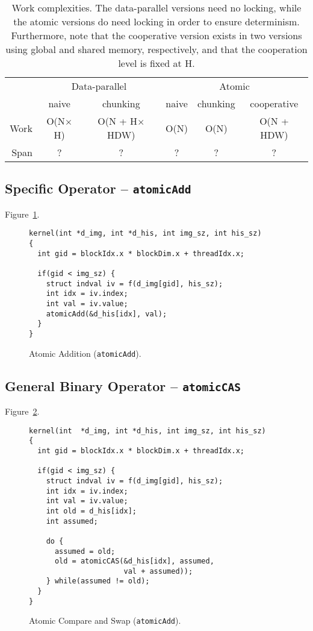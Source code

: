 %
\begin{table}
\begin{center}
\begin{tabular}{rccccc}
\toprule
& \multicolumn{2}{c}{Data-parallel} & \multicolumn{3}{c}{Atomic} \\
\cmidrule(lr){2-3} \cmidrule(lr){4-6}
& naive & chunking & naive & chunking & cooperative \\
\midrule
Work & O(N$\times$H) & O(N + H$\times$HDW) & O(N) & O(N) & O(N + HDW) \\
Span & ? & ? & ? & ? & ? \\
\bottomrule
\end{tabular}
\caption{Work complexities. The data-parallel versions need
  no locking, while the atomic versions do need locking in
  order to ensure determinism. Furthermore, note that the
  cooperative version exists in two versions using global
  and shared memory, respectively, and that the cooperation
  level is fixed at H.}
\label{tab:work_complexities}
\end{center}
\end{table}
%

\subsection{Specific Operator -- \texttt{atomicAdd}}

Figure~\ref{fig:add_kernel}.
%
\begin{figure}
\begin{lstlisting}
kernel(int *d_img, int *d_his, int img_sz, int his_sz)
{
  int gid = blockIdx.x * blockDim.x + threadIdx.x;

  if(gid < img_sz) {
    struct indval iv = f(d_img[gid], his_sz);
    int idx = iv.index;
    int val = iv.value;
    atomicAdd(&d_his[idx], val);
  }
}
\end{lstlisting}
\caption{Atomic Addition (\texttt{atomicAdd}).}
\label{fig:add_kernel}
\end{figure}
%



\subsection{General Binary Operator -- \texttt{atomicCAS}}

Figure~\ref{fig:cas_kernel}.
%
\begin{figure}
\begin{lstlisting}
kernel(int  *d_img, int *d_his, int img_sz, int his_sz)
{
  int gid = blockIdx.x * blockDim.x + threadIdx.x;

  if(gid < img_sz) {
    struct indval iv = f(d_img[gid], his_sz);
    int idx = iv.index;
    int val = iv.value;
    int old = d_his[idx];
    int assumed;

    do {
      assumed = old;
      old = atomicCAS(&d_his[idx], assumed,
                      val + assumed));
    } while(assumed != old);
  }
}
\end{lstlisting}
\caption{Atomic Compare and Swap (\texttt{atomicAdd}).}
\label{fig:cas_kernel}
\end{figure}
%




